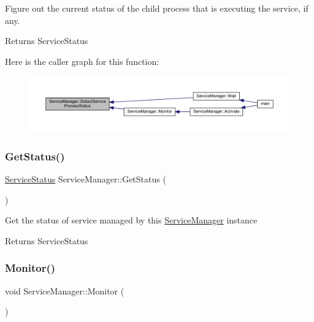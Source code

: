 Figure out the current status of the child process that is executing the service, if any. \begin{DoxyReturn}{Returns}
Service\+Status 
\end{DoxyReturn}
Here is the caller graph for this function\+:
\nopagebreak
\begin{figure}[H]
\begin{center}
\leavevmode
\includegraphics[width=350pt]{classServiceManager_abaa048208d3f357f320f89f108e5bada_icgraph}
\end{center}
\end{figure}
\mbox{\label{classServiceManager_add57f37806af173b969249bd97048928}} 
\subsubsection{\texorpdfstring{Get\+Status()}{GetStatus()}}
{\footnotesize\ttfamily \hyperlink{classServiceManager_af3f2b1502eece536d0e4c8d3f2fa439d}{Service\+Status} Service\+Manager\+::\+Get\+Status (\begin{DoxyParamCaption}{ }\end{DoxyParamCaption})}

Get the status of service managed by this \hyperlink{classServiceManager}{Service\+Manager} instance

\begin{DoxyReturn}{Returns}
Service\+Status 
\end{DoxyReturn}
\mbox{\label{classServiceManager_a88f70377d5303fe8ddf0c09a31f52685}} 
\subsubsection{\texorpdfstring{Monitor()}{Monitor()}}
{\footnotesize\ttfamily void Service\+Manager\+::\+Monitor (\begin{DoxyParamCaption}{ }\end{DoxyParamCaption})\hspace{0.3cm}{\ttfamily [private]}}

